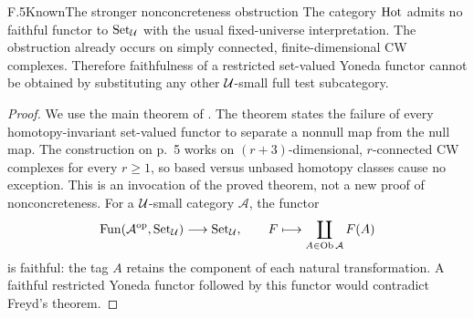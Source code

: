 \begin{claim}{F.5}{Known}{The stronger nonconcreteness obstruction}
The category $\mathrm{Hot}$ admits no faithful functor to $\mathrm{Set}_{\mathcal U}$ with
the usual fixed-universe interpretation. The obstruction already
occurs on simply connected, finite-dimensional CW complexes. Therefore
faithfulness of a restricted set-valued Yoneda functor cannot be
obtained by substituting any other $\mathcal U$-small full test subcategory.
\end{claim}
\begin{proof}
We use the main theorem of \citet[p.~1 and the conclusion on p.~5 of
the 2004 reprint]{Freyd1970}. The theorem states the failure of every
homotopy-invariant set-valued functor to separate a nonnull map from
the null map. The construction on p.~5 works on $(r+3)$-dimensional,
$r$-connected CW complexes for every $r\geq1$, so based versus
unbased homotopy classes cause no exception. This is an invocation
of the proved theorem, not a new proof of nonconcreteness. For a
$\mathcal U$-small category $\mathcal A$, the functor
\[
 \operatorname{Fun}(\mathcal A^{\mathrm{op}},\mathrm{Set}_{\mathcal U})\longrightarrow\mathrm{Set}_{\mathcal U},
 \qquad F\longmapsto\coprod_{A\in\operatorname{Ob}\mathcal A}F(A)
\]
is faithful: the tag $A$ retains the component of each natural
transformation. A faithful restricted Yoneda functor followed by
this functor would contradict Freyd's theorem.
\end{proof}

